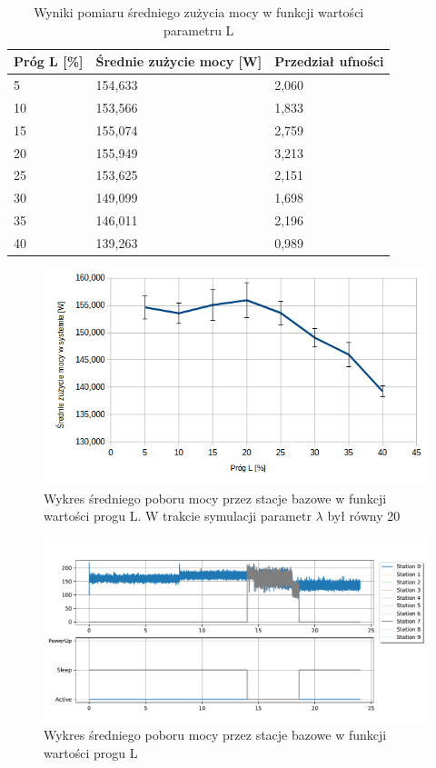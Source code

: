 \begin{table}[h]
\renewcommand{\arraystretch}{1.5}
\centering
\caption{Wyniki pomiaru średniego zużycia mocy w funkcji wartości parametru L}
\label{power_usage_by_l}
\begin{tabular}{|l|l|l|}
\hline
Próg L {[}\%{]} & Średnie zużycie mocy {[}W{]} & Przedział ufności \\ \hline
5 & 154,633 & 2,060 \\ \hline
10 & 153,566 & 1,833 \\ \hline
15 & 155,074 & 2,759 \\ \hline
20 & 155,949 & 3,213 \\ \hline
25 & 153,625 & 2,151 \\ \hline
30 & 149,099 & 1,698 \\ \hline
35 & 146,011 & 2,196 \\ \hline
40 & 139,263 & 0,989 \\ \hline
\end{tabular}
\end{table}

\begin{figure}[h!]
\center
\includegraphics[scale=0.75]{img/power_by_l.png} 
\caption{Wykres średniego poboru mocy przez stacje bazowe w funkcji wartości progu L. W trakcie symulacji parametr $\lambda$ był równy 20}
\label{power_usage_lambda_sleep}
\end{figure}

\begin{figure}[h]
\center
\includegraphics[scale=0.65]{img/usage_over_time_sleep.pdf} 
\caption{Wykres średniego poboru mocy przez stacje bazowe w funkcji wartości progu L}
\label{usage_over_time_sleep}
\end{figure}

